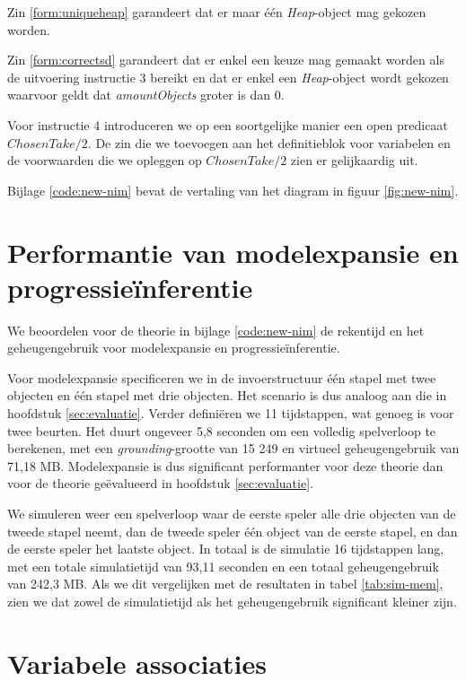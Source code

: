 Zin \ref{form:uniqueheap} garandeert dat er maar \'e\'en \textit{Heap}-object mag gekozen worden.

Zin \ref{form:correctsd} garandeert dat er enkel een keuze mag gemaakt worden als de uitvoering instructie 3 bereikt en dat er enkel een \textit{Heap}-object wordt gekozen waarvoor geldt dat \textit{amountObjects} groter is dan 0.

Voor instructie 4 introduceren we op een soortgelijke manier een open predicaat $ChosenTake/2$. De zin die we toevoegen aan het definitieblok voor variabelen en de voorwaarden die we opleggen op $ChosenTake/2$ zien er gelijkaardig uit.

Bijlage \ref{code:new-nim} bevat de vertaling van het diagram in figuur \ref{fig:new-nim}.

\section{Performantie van modelexpansie en progressie\"inferentie}\label{sec:dec-performance}

We beoordelen voor de theorie in bijlage \ref{code:new-nim} de rekentijd en het geheugengebruik voor modelexpansie en progressie\"inferentie.

Voor modelexpansie specificeren we in de invoerstructuur \'e\'en stapel met twee objecten en \'e\'en stapel met drie objecten. Het scenario is dus analoog aan die in hoofdstuk \ref{sec:evaluatie}. Verder defini\"eren we 11 tijdstappen, wat genoeg is voor twee beurten. Het duurt ongeveer 5,8 seconden om een volledig spelverloop te berekenen, met een \textit{grounding}-grootte van 15 249 en virtueel geheugengebruik van 71,18 MB. Modelexpansie is dus significant performanter voor deze theorie dan voor de theorie ge\"evalueerd in hoofdstuk \ref{sec:evaluatie}.

We simuleren weer een spelverloop waar de eerste speler alle drie objecten van de tweede stapel neemt, dan de tweede speler \'e\'en object van de eerste stapel, en dan de eerste speler het laatste object. In totaal is de simulatie 16 tijdstappen lang, met een totale simulatietijd van 93,11 seconden en een totaal geheugengebruik van 242,3 MB. Als we dit vergelijken met de resultaten in tabel \ref{tab:sim-mem}, zien we dat zowel de simulatietijd als het geheugengebruik significant kleiner zijn.

\section{Variabele associaties}

